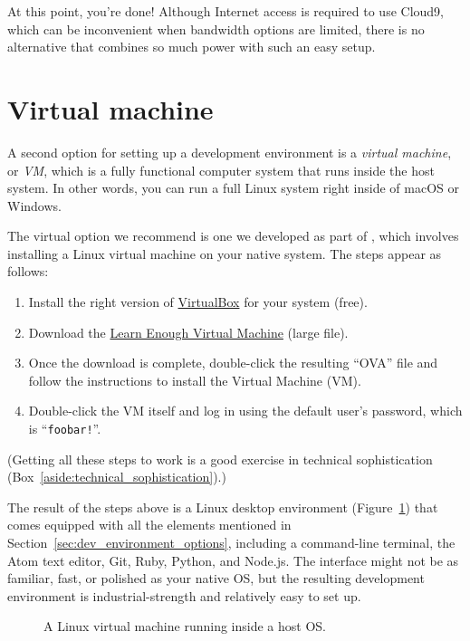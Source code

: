 At this point, you're done! Although Internet access is required to use Cloud9, which can be inconvenient when bandwidth options are limited, there is no alternative that combines so much power with such an easy setup.

\section{Virtual machine} %
\label{sec:virtual_machine}

A second option for setting up a development environment is a \emph{virtual machine}, or \emph{VM}, which is a fully functional computer system that runs inside the host system. In other words, you can run a full Linux system right inside of macOS or Windows.

The virtual option we recommend is one we developed as part of \lecl, which involves installing a Linux virtual machine on your native system. The steps appear as follows:

\begin{enumerate}
\item Install the right version of \href{https://www.virtualbox.org/}{VirtualBox} for your system (free).
\item Download the \href{https://softcover-static.s3.amazonaws.com/LearnEnough-v.1.4.ova}{Learn Enough Virtual Machine} (large file).
\item Once the download is complete, double-click the resulting ``OVA'' file and follow the instructions to install the Virtual Machine (VM).
\item Double-click the VM itself and log in using the default user's password, which is ``\texttt{foobar!}''.
\end{enumerate}
(Getting all these steps to work is a good exercise in technical sophistication (Box~\ref{aside:technical_sophistication}).)

The result of the steps above is a Linux desktop environment (Figure~\ref{fig:virtual_machine}) that comes equipped with all the elements mentioned in Section~\ref{sec:dev_environment_options}, including a command-line terminal, the Atom text editor, Git, Ruby, Python, and Node.js. The interface might not be as familiar, fast, or polished as your native OS, but the resulting development environment is industrial-strength and relatively easy to set up.

\begin{figure}
\begin{center}
\end{center}
\caption{A Linux virtual machine running inside a host OS.\label{fig:virtual_machine}}
\end{figure}

